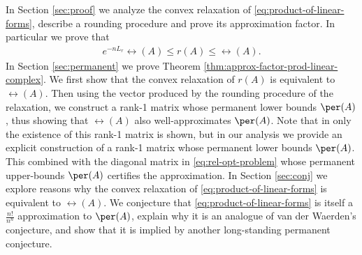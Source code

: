 In Section \ref{sec:proof} we analyze the convex relaxation of
\eqref{eq:product-of-linear-forms}, describe a rounding procedure and prove its
approximation factor. In particular we prove that
\begin{align*}
  e^{-nL_r} \rel(A) \le r(A) \le \rel(A).
\end{align*}
In Section \ref{sec:permanent} we prove Theorem
\ref{thm:approx-factor-prod-linear-complex}. We first show that the convex
relaxation of $r(A)$ is equivalent to $\rel(A)$. Then using the vector produced
by the rounding procedure of the relaxation, we construct a rank-1 matrix whose
permanent lower bounds $\per(A)$, thus showing that $\rel(A)$ also
well-approximates $\per(A)$. Note that in
\cite{AnariSimplyExponentialApproximation2017a} only the existence of this
rank-1 matrix is shown, but in our analysis we provide an explicit construction
of a rank-1 matrix whose permanent lower bounds $\per(A)$. This combined with
the diagonal matrix in \eqref{eq:rel-opt-problem} whose permanent upper-bounds
$\per(A)$ certifies the approximation. In Section \ref{sec:conj} we explore
reasons why the convex relaxation of \eqref{eq:product-of-linear-forms} is
equivalent to $\rel(A)$. We conjecture that \eqref{eq:product-of-linear-forms}
is itself a $\frac{n!}{n^n}$ approximation to $\per(A)$, explain why it is an
analogue of van der Waerden's conjecture, and show that it is implied by another
long-standing permanent conjecture.


